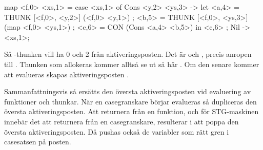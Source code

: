 \documentclass[../Core]{subfiles}
\begin{document}
\begin{codeEx}
map <f,0> <xs,1> = case <xs,1> of
    { Cons <y,2> <ys,3> -> let
        { <a,4> = THUNK [<f,0>, <y,2>]  (<f,0> <y,1>)
        ; <b,5> = THUNK [<f,0>, <ys,3>] (map <f,0> <ys,1>)
        ; <c,6> = CON (Cons <a,4> <b,5>)
        } in <c,6>
    ; Nil -> <xs,1>};
\end{codeEx}

Så -thunken  vill ha 0 och 2 från
aktiveringsposten. Det är  och , precis anropen till
. 
Thunken som allokeras kommer alltså se ut så här
.
Om den senare kommer att evalueras skapas aktiveringsposten \miniCode{[cube,1]}.


Sammanfattningsvis så ersätts den översta aktiveringsposten vid 
evaluering av funktioner och thunkar. När en casegranskare börjar evalueras
så dupliceras den översta aktiveringsposten. Att returnera från en funktion,
och för STG-maskinen innebär det att returnera från en casegranskare,
resulterar i att poppa den översta aktiveringsposten. Då pushas också 
de variabler som rätt gren i casesatsen på posten.  





   



 
\end{document}
